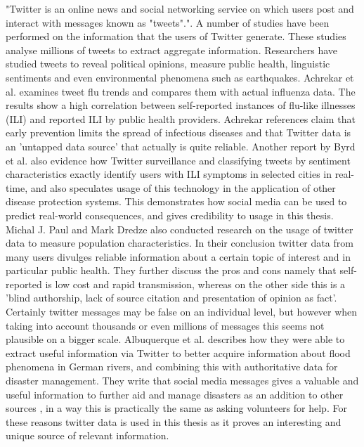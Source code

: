 "Twitter is an online news and social networking service on which users post and interact with messages known as "tweets"."\cite{twitter_twitter}. A number of studies have been performed on the information that the users of Twitter generate. These studies analyse millions of tweets to extract aggregate information. Researchers have studied tweets to reveal political opinions\cite{twitter_politic}, measure public health\cite{twitter_flu_trends}, linguistic sentiments\cite{twitter_linguistics} and even environmental phenomena such as earthquakes\cite{twitter_earthQuake}. Achrekar et al.\cite{twitter_flu_trends} examines tweet flu trends and compares them with actual influenza data. The results show a high correlation between self-reported instances of flu-like illnesses (ILI) and reported ILI by public health providers. Achrekar references claim that early prevention limits the spread of infectious diseases and that Twitter data is an 'untapped data source' that actually is quite reliable. Another report by Byrd et al.\cite{byrd2016mining} also evidence how Twitter surveillance and classifying tweets by sentiment characteristics exactly identify users with ILI symptoms in selected cities in real-time, and also speculates usage of this technology in the application of other disease protection systems. This demonstrates how social media can be  used to predict real-world consequences, and gives credibility to usage in this thesis. \\Michal J. Paul and Mark Dredze \cite{twitter_what_you_tweet} also conducted research on the usage of twitter data to measure population characteristics. In their conclusion twitter data from many users divulges reliable information about a certain topic of interest and in particular public health. They further discuss the pros and cons namely that self-reported is low cost and rapid transmission, whereas on the other side this is a 'blind authorship, lack of source citation and presentation of opinion as fact'. Certainly twitter messages may be false on an individual level, but however when taking into account thousands or even millions of messages this seems not plausible on a bigger scale. Albuquerque et al. \cite{de2015geographic} describes how they were able to extract useful information via Twitter to better acquire information about flood phenomena in German rivers, and combining this with authoritative data for disaster management. They write that social media messages gives a valuable and useful information to further aid and manage disasters as an addition to other sources , in a way this is practically the same as asking volunteers for help. For these reasons twitter data is used in this thesis as it proves an interesting and unique source of relevant information.





